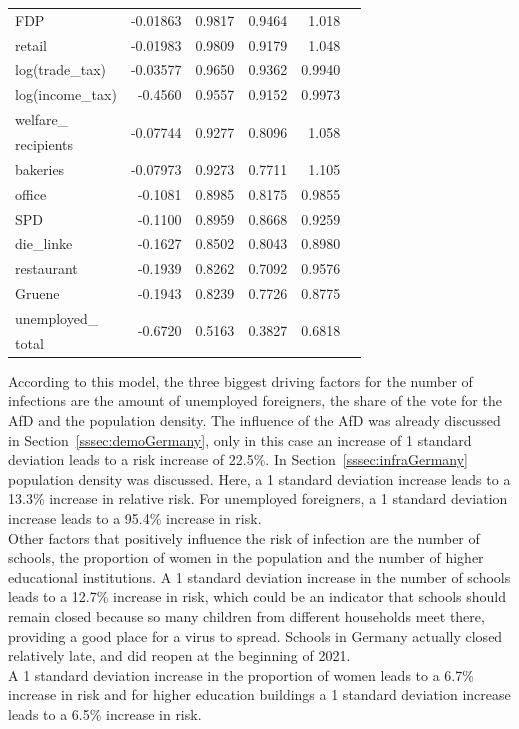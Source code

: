 \begin{table}[H]
\begin{tabular}{l r r r r c}
FDP & -0.01863 & 0.9817 & 0.9464 & 1.018 \\
retail & -0.01983 & 0.9809 & 0.9179 & 1.048 \\
log(trade\_tax) & -0.03577 & 0.9650 & 0.9362 & 0.9940 \\
log(income\_tax) & -0.4560 & 0.9557 & 0.9152 & 0.9973 \\
welfare\_ & \multirow{2}{*}{-0.07744} & \multirow{2}{*}{0.9277} & \multirow{2}{*}{0.8096} & \multirow{2}{*}{1.058} \\
recipients &  \\
bakeries & -0.07973 & 0.9273 & 0.7711 & 1.105 \\
office & -0.1081 & 0.8985 & 0.8175 & 0.9855 \\
SPD & -0.1100 & 0.8959 & 0.8668 & 0.9259 \\
die\_linke & -0.1627 & 0.8502 & 0.8043 & 0.8980 \\
restaurant & -0.1939 & 0.8262 & 0.7092 & 0.9576 \\
Gruene & -0.1943 & 0.8239 & 0.7726 & 0.8775 \\
unemployed\_ & \multirow{2}{*}{-0.6720} & \multirow{2}{*}{0.5163} & \multirow{2}{*}{0.3827} & \multirow{2}{*}{0.6818} \\
total & \\
\bottomrule
\end{tabular}
\end{table}
According to this model, the three biggest driving factors for the number of infections are the amount of unemployed foreigners, the share of the vote for the AfD and the population density. The influence of the AfD was already discussed in Section~\ref{sssec:demoGermany}, only in this case an increase of 1 standard deviation leads to a risk increase of 22.5\%. In Section~\ref{sssec:infraGermany} population density was discussed. Here, a 1 standard deviation increase leads to a 13.3\% increase in relative risk. For unemployed foreigners, a 1 standard deviation increase leads to a 95.4\% increase in risk. \\
Other factors that positively influence the risk of infection are the number of schools, the proportion of women in the population and the number of higher educational institutions. A 1 standard deviation increase in the number of schools leads to a 12.7\% increase in risk, which could be an indicator that schools should remain closed because so many children from different households meet there, providing a good place for a virus to spread. Schools in Germany actually closed relatively late, and did reopen at the beginning of 2021.\\
A 1 standard deviation increase in the proportion of women leads to a 6.7\% increase in risk and for higher education buildings a 1 standard deviation increase leads to a 6.5\% increase in risk. 
